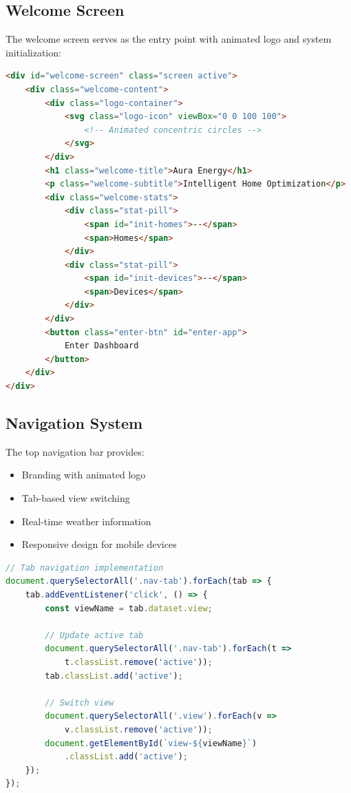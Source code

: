 \documentclass[12pt,a4paper]{article}
\begin{document}
\subsection{Welcome Screen}

The welcome screen serves as the entry point with animated logo and system initialization:

\begin{lstlisting}[language=HTML, caption=Welcome screen structure]
<div id="welcome-screen" class="screen active">
    <div class="welcome-content">
        <div class="logo-container">
            <svg class="logo-icon" viewBox="0 0 100 100">
                <!-- Animated concentric circles -->
            </svg>
        </div>
        <h1 class="welcome-title">Aura Energy</h1>
        <p class="welcome-subtitle">Intelligent Home Optimization</p>
        <div class="welcome-stats">
            <div class="stat-pill">
                <span id="init-homes">--</span>
                <span>Homes</span>
            </div>
            <div class="stat-pill">
                <span id="init-devices">--</span>
                <span>Devices</span>
            </div>
        </div>
        <button class="enter-btn" id="enter-app">
            Enter Dashboard
        </button>
    </div>
</div>
\end{lstlisting}

\subsection{Navigation System}

The top navigation bar provides:
\begin{itemize}[leftmargin=*]
    \item Branding with animated logo
    \item Tab-based view switching
    \item Real-time weather information
    \item Responsive design for mobile devices
\end{itemize}

\begin{lstlisting}[language=JavaScript, caption=View switching logic]
// Tab navigation implementation
document.querySelectorAll('.nav-tab').forEach(tab => {
    tab.addEventListener('click', () => {
        const viewName = tab.dataset.view;
        
        // Update active tab
        document.querySelectorAll('.nav-tab').forEach(t => 
            t.classList.remove('active'));
        tab.classList.add('active');
        
        // Switch view
        document.querySelectorAll('.view').forEach(v => 
            v.classList.remove('active'));
        document.getElementById(`view-${viewName}`)
            .classList.add('active');
    });
});
\end{lstlisting}
\end{document}
